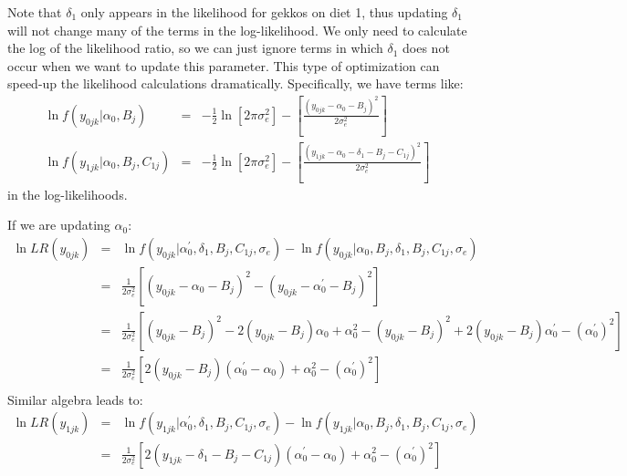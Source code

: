 \documentclass[11pt]{article}
\begin{document}
Note that $\delta_1$ only appears in the likelihood for gekkos on diet 1, thus updating $\delta_1$ will not change many of the terms in the log-likelihood.  
We only need to calculate the log of the likelihood ratio, so we can just ignore terms in which $\delta_1$ does not occur when we want to update this parameter. 
This type of optimization can speed-up the likelihood calculations dramatically.
Specifically, we have terms like:
\begin{eqnarray*}
\ln f(y_{0jk}|\alpha_0, B_j) & = &  -\frac{1}{2}\ln\left[2\pi\sigma_e^2\right] - \left[{\frac{\left(y_{0jk}-\alpha_0 - B_j\right)^2}{2\sigma_e^2}}\right] \\
\ln f(y_{1jk}|\alpha_0, B_j,  C_{1j}) & = &  -\frac{1}{2}\ln\left[2\pi\sigma_e^2\right] - \left[{\frac{\left(y_{1jk}  -\alpha_0 - \delta_1 - B_j - C_{1j}\right)^2}{2\sigma_e^2}}\right]
\end{eqnarray*}
in the log-likelihoods.

If we are updating $\alpha_0$:
\begin{eqnarray*}
\ln LR(y_{0jk}) & = &  \ln f(y_{0jk}|\alpha_0^{\prime},\delta_1, B_j,C_{1j},\sigma_e) - \ln f(y_{0jk}|\alpha_0, B_j,\delta_1, B_j,C_{1j},\sigma_e) \\
 & = &  \frac{1}{2\sigma_e^2}  \left[\left(y_{0jk}-\alpha_0 - B_j\right)^2 - \left(y_{0jk}-\alpha_0^\prime - B_j\right)^2\right] \\
		& = &  \frac{1}{2\sigma_e^2}  \left[\left(y_{0jk} - B_j\right)^2 - 2 \left(y_{0jk} - B_j\right)\alpha_0 + \alpha_0^2 - \left(y_{0jk} - B_j\right)^2 + 2 \left(y_{0jk} - B_j\right)\alpha_0^\prime - (\alpha_0^{\prime})^2\right] \\
		& = &  \frac{1}{2\sigma_e^2}  \left[2 \left(y_{0jk} - B_j\right)(\alpha_0^\prime - \alpha_0) + \alpha_0^2- (\alpha_0^{\prime})^2\right]\\
\end{eqnarray*}
Similar algebra leads to:
\begin{eqnarray*}
\ln LR(y_{1jk}) & = &  \ln f(y_{1jk}|\alpha_0^{\prime},\delta_1, B_j,C_{1j},\sigma_e) - \ln f(y_{1jk}|\alpha_0, B_j,\delta_1, B_j,C_{1j},\sigma_e) \\
		& = &  \frac{1}{2\sigma_e^2}  \left[2 \left(y_{1jk} -\delta_1 - B_j-C_{1j}\right)(\alpha_0^\prime - \alpha_0) + \alpha_0^2- (\alpha_0^{\prime})^2\right]\\
\end{eqnarray*}
\end{document}
